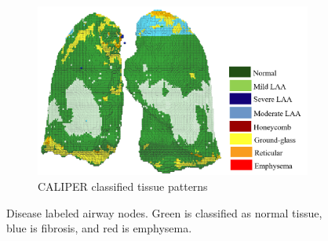 \begin{figure}[htbp]
\hspace{.5in} %
\begin{subfigure}{.51\linewidth}%
  \includegraphics[width=\linewidth,trim={{.0\wd0} {.0\wd0} {.0\wd0} {.0\wd0}},clip]{ModelBasedAnalysis/Image/IPF501_CAPLIPERClassifiedData_colorbar.png}
  \caption{CALIPER classified tissue patterns}
  \label{fig:DiseaseLabeling-b} 
\end{subfigure}
\caption{Disease labeled airway nodes. Green is classified as normal tissue, blue is fibrosis, and red is emphysema.}
\label{fig:DiseaseLabeling}
\end{figure}


